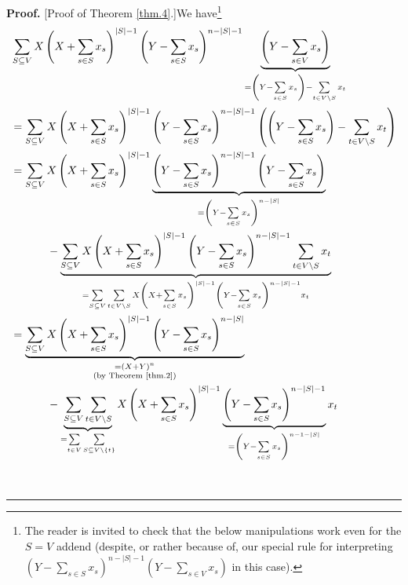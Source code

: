 \documentclass[numbers=enddot,12pt,final,onecolumn,notitlepage]{scrartcl}%
\theoremstyle{definition}
\newenvironment{proof}[1][Proof]{\noindent\textbf{#1.} }{\ \rule{0.5em}{0.5em}}
\let\sumnonlimits\sum
\renewcommand{\sum}{\sumnonlimits\limits}
\newenvironment{vershort}{}{}
\begin{document}
\begin{vershort}
\begin{proof}
[Proof of Theorem \ref{thm.4}.]We have\footnote{The reader is invited to check
that the below manipulations work even for the $S=V$ addend (despite, or
rather because of, our special rule for interpreting $\left(  Y-\sum_{s\in
S}x_{s}\right)  ^{n-\left\vert S\right\vert -1}\left(  Y-\sum_{s\in V}%
x_{s}\right)  $ in this case).}
\begin{align*}
&  \sum_{S\subseteq V}X\left(  X+\sum_{s\in S}x_{s}\right)  ^{\left\vert
S\right\vert -1}\left(  Y-\sum_{s\in S}x_{s}\right)  ^{n-\left\vert
S\right\vert -1}\underbrace{\left(  Y-\sum_{s\in V}x_{s}\right)  }_{=\left(
Y-\sum_{s\in S}x_{s}\right)  -\sum_{t\in V\setminus S}x_{t}}\\
&  =\sum_{S\subseteq V}X\left(  X+\sum_{s\in S}x_{s}\right)  ^{\left\vert
S\right\vert -1}\left(  Y-\sum_{s\in S}x_{s}\right)  ^{n-\left\vert
S\right\vert -1}\left(  \left(  Y-\sum_{s\in S}x_{s}\right)  -\sum_{t\in
V\setminus S}x_{t}\right) \\
&  =\sum_{S\subseteq V}X\left(  X+\sum_{s\in S}x_{s}\right)  ^{\left\vert
S\right\vert -1}\underbrace{\left(  Y-\sum_{s\in S}x_{s}\right)
^{n-\left\vert S\right\vert -1}\left(  Y-\sum_{s\in S}x_{s}\right)
}_{=\left(  Y-\sum_{s\in S}x_{s}\right)  ^{n-\left\vert S\right\vert }}\\
&  \ \ \ \ \ \ \ \ \ \ -\underbrace{\sum_{S\subseteq V}X\left(  X+\sum_{s\in
S}x_{s}\right)  ^{\left\vert S\right\vert -1}\left(  Y-\sum_{s\in S}%
x_{s}\right)  ^{n-\left\vert S\right\vert -1}\sum_{t\in V\setminus S}x_{t}%
}_{=\sum_{S\subseteq V}\sum_{t\in V\setminus S}X\left(  X+\sum_{s\in S}%
x_{s}\right)  ^{\left\vert S\right\vert -1}\left(  Y-\sum_{s\in S}%
x_{s}\right)  ^{n-\left\vert S\right\vert -1}x_{t}}\\
&  =\underbrace{\sum_{S\subseteq V}X\left(  X+\sum_{s\in S}x_{s}\right)
^{\left\vert S\right\vert -1}\left(  Y-\sum_{s\in S}x_{s}\right)
^{n-\left\vert S\right\vert }}_{\substack{=\left(  X+Y\right)  ^{n}\\\text{(by
Theorem \ref{thm.2})}}}\\
&  \ \ \ \ \ \ \ \ \ \ -\underbrace{\sum_{S\subseteq V}\sum_{t\in V\setminus
S}}_{=\sum_{t\in V}\sum_{S\subseteq V\setminus\left\{  t\right\}  }}X\left(
X+\sum_{s\in S}x_{s}\right)  ^{\left\vert S\right\vert -1}\underbrace{\left(
Y-\sum_{s\in S}x_{s}\right)  ^{n-\left\vert S\right\vert -1}}_{=\left(
Y-\sum_{s\in S}x_{s}\right)  ^{n-1-\left\vert S\right\vert }}x_{t}%
\end{align*}%

\end{proof}
\end{vershort}
\end{document}
